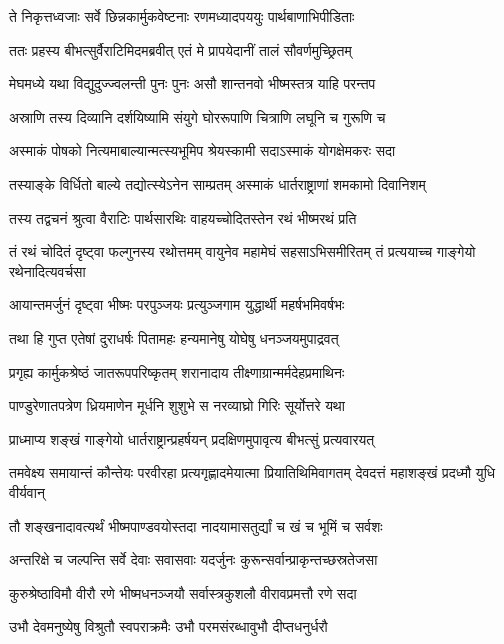 \twolineshloka
{ते निकृत्तध्वजाः सर्वे छिन्नकार्मुकवेष्टनाः}
{रणमध्यादपययुः पार्थबाणाभिपीडिताः}


\twolineshloka
{ततः प्रहस्य बीभत्सुर्वैराटिमिदमब्रवीत्}
{एतं मे प्रापयेदानीं तालं सौवर्णमुच्छ्रितम्}


\twolineshloka
{मेघमध्ये यथा विद्युदुज्ज्वलन्ती पुनः पुनः}
{असौ शान्तनवो भीष्मस्तत्र याहि परन्तप}


\twolineshloka
{अस्राणि तस्य दिव्यानि दर्शयिष्यामि संयुगे}
{घोररूपाणि चित्राणि लघूनि च गुरूणि च}


\twolineshloka
{अस्माकं पोषको नित्यमाबाल्यान्मत्स्यभूमिप}
{श्रेयस्कामी सदाऽस्माकं योगक्षेमकरः सदा}


\twolineshloka
{तस्याङ्के विर्धितो बाल्ये तद्योत्स्येऽनेन साम्प्रतम्}
{अस्माकं धार्तराष्ट्राणां शमकामो दिवानिशम्}



\twolineshloka
{तस्य तद्वचनं श्रुत्वा वैराटिः पार्थसारथिः}
{वाहयच्चोदितस्तेन रथं भीष्मरथं प्रति}


\threelineshloka
{तं रथं चोदितं दृष्ट्वा फल्गुनस्य रथोत्तमम्}
{वायुनेव महामेघं सहसाऽभिसमीरितम्}
{तं प्रत्ययाच्च गाङ्गेयो रथेनादित्यवर्चसा}


\twolineshloka
{आयान्तमर्जुनं दृष्ट्वा भीष्मः परपुञ्जयः}
{प्रत्युञ्जगाम युद्धार्थी महर्षभमिवर्षभः}


\twolineshloka
{तथा हि गुप्त एतेषां दुराधर्षः पितामहः}
{हन्यमानेषु योघेषु धनञ्जयमुपाद्रवत्}


\twolineshloka
{प्रगृह्य कार्मुकश्रेष्ठं जातरूपपरिष्कृतम्}
{शरानादाय तीक्ष्णाग्रान्मर्मदेहप्रमाथिनः}


\twolineshloka
{पाण्डुरेणातपत्रेण ध्रियमाणेन मूर्धनि}
{शुशुभे स नरव्याघ्रो गिरिः सूर्योत्तरे यथा}


\twolineshloka
{प्राध्माप्य शङ्खं गाङ्गेयो धार्तराष्ट्रान्प्रहर्षयन्}
{प्रदक्षिणमुपावृत्य बीभत्सुं प्रत्यवारयत्}


\threelineshloka
{तमवेक्ष्य समायान्तं कौन्तेयः परवीरहा}
{प्रत्यगृह्णादमेयात्मा प्रियातिथिमिवागतम्}
{देवदत्तं महाशङ्खं प्रदध्मौ युधि वीर्यवान्}


\twolineshloka
{तौ शङ्खनादावत्यर्थं भीष्मपाण्डवयोस्तदा}
{नादयामासतुर्द्यां च खं च भूमिं च सर्वशः}


\twolineshloka
{अन्तरिक्षे च जल्पन्ति सर्वे देवाः सवासवाः}
{यदर्जुनः कुरून्सर्वान्प्राकृन्तच्छस्रतेजसा}


\twolineshloka
{कुरुश्रेष्ठाविमौ वीरौ रणे भीष्मधनञ्जयौ}
{सर्वास्त्रकुशलौ वीरावप्रमत्तौ रणे सदा}


\twolineshloka
{उभौ देवमनुष्येषु विश्रुतौ स्वपराक्रमैः}
{उभौ परमसंरब्धावुभौ दीप्तधनुर्धरौ}



